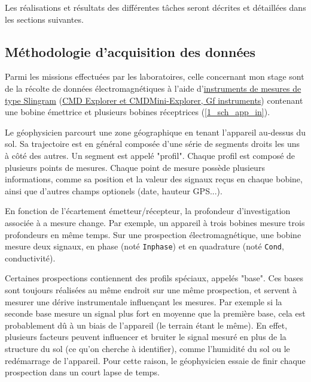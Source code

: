 \documentclass[12pt]{article}
\begin{document}
    Les réalisations et résultats des différentes tâches seront décrites et détaillées dans les sections suivantes.

\subsection{Méthodologie d'acquisition des données}

    \label{1_sch_app_out} Parmi les missions effectuées par les laboratoires, celle concernant mon stage sont de la récolte de données électromagnétiques à l'aide d'\href{https://fr.wikipedia.org/wiki/G%C3%A9ophysique_appliqu%C3%A9e#Prospection_%C3%A9lectromagn%C3%A9tique}{instruments de mesures de type Slingram} (\href{https://www.geomatrix.co.uk/rentals/land-products/electromagnetic/cmd-explorer/}{CMD Explorer et CMDMini-Explorer, Gf instruments}) contenant une bobine émettrice et plusieurs bobines réceptrices (\ref{1_sch_app_in}).
    
    Le géophysicien parcourt une zone géographique en tenant l'appareil au-dessus du sol. Sa trajectoire est en général composée d'une série de segments droits les uns à côté des autres. Un segment est appelé "profil". Chaque profil est composé de plusieurs points de mesures. Chaque point de mesure possède plusieurs informations, comme sa position et la valeur des signaux reçus en chaque bobine, ainsi que d'autres champs optionels (date, hauteur GPS...).

    En fonction de l'écartement émetteur/récepteur, la profondeur d'investigation associée à a mesure change. Par exemple, un appareil à trois bobines mesure trois profondeurs en même temps. Sur une prospection électromagnétique, une bobine mesure deux signaux, en phase (noté \texttt{Inphase}) et en quadrature (noté \texttt{Cond}, conductivité).

    Certaines prospections contiennent des profils spéciaux, appelés "base". Ces bases sont toujours réalisées au même endroit sur une même prospection, et servent à mesurer une dérive instrumentale influençant les mesures. Par exemple si la seconde base mesure un signal plus fort en moyenne que la première base, cela est probablement dû à un biais de l'appareil (le terrain étant le même). En effet, plusieurs facteurs peuvent influencer et bruiter le signal mesuré en plus de la structure du sol (ce qu'on cherche à identifier), comme l'humidité du sol ou le redémarrage de l'appareil. Pour cette raison, le géophysicien essaie de finir chaque prospection dans un court lapse de temps.
\end{document}
